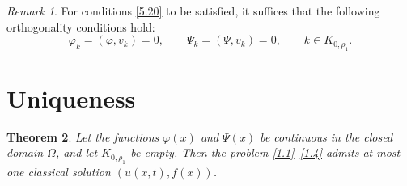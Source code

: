 \documentclass[12pt, reqno]{amsart}
\newtheorem{theorem}{Theorem}[section]
\theoremstyle{definition}
\theoremstyle{remark}
\newtheorem{remark}[theorem]{Remark}
\numberwithin{equation}{section}
\begin{document}
\begin{remark}
    For conditions \eqref{5.20} to be satisfied, it suffices that the following orthogonality
conditions hold:
\[
\varphi_k = (\varphi, v_k) = 0, 
\qquad 
\Psi_k = (\Psi, v_k) = 0, 
\qquad 
k \in K_{0,\rho_1}.
\]
\end{remark}

\section{Uniqueness}\label{sec:6}

\begin{theorem}
Let the functions $\varphi(x)$ and $\Psi(x)$ be continuous in the closed domain $\Omega$, and let $K_{0,\rho_1}$ be empty.
Then the problem \eqref{1.1}--\eqref{1.4} admits at most one classical solution $(u(x,t),f(x))$.
\end{theorem}
\end{document}

